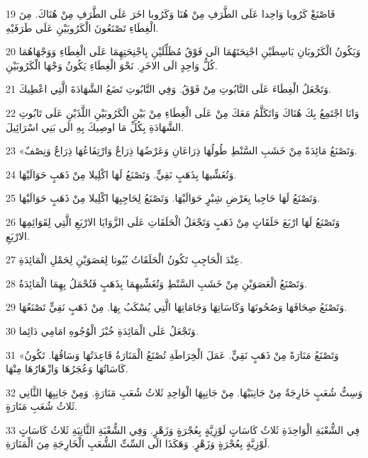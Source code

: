 \par 19 فَاصْنَعْ كَرُوبا وَاحِدا عَلَى الطَّرَفِ مِنْ هُنَا وَكَرُوبا اخَرَ عَلَى الطَّرَفِ مِنْ هُنَاكَ. مِنَ الْغِطَاءِ تَصْنَعُونَ الْكَرُوبَيْنِ عَلَى طَرَفَيْهِ.
\par 20 وَيَكُونُ الْكَرُوبَانِ بَاسِطَيْنِ اجْنِحَتَهُمَا الَى فَوْقُ مُظَلِّلَيْنِ بِاجْنِحَتِهِمَا عَلَى الْغِطَاءِ وَوَجْهَاهُمَا كُلُّ وَاحِدٍ الَى الاخَرِ. نَحْوَ الْغِطَاءِ يَكُونُ وَجْهَا الْكَرُوبَيْنِ.
\par 21 وَتَجْعَلُ الْغِطَاءَ عَلَى التَّابُوتِ مِنْ فَوْقُ. وَفِي التَّابُوتِ تَضَعُ الشَّهَادَةَ الَّتِي اعْطِيكَ.
\par 22 وَانَا اجْتَمِعُ بِكَ هُنَاكَ وَاتَكَلَّمُ مَعَكَ مِنْ عَلَى الْغِطَاءِ مِنْ بَيْنِ الْكَرُوبَيْنِ اللَّذَيْنِ عَلَى تَابُوتِ الشَّهَادَةِ بِكُلِّ مَا اوصِيكَ بِهِ الَى بَنِي اسْرَائِيلَ.
\par 23 «وَتَصْنَعُ مَائِدَةً مِنْ خَشَبِ السَّنْطِ طُولُهَا ذِرَاعَانِ وَعَرْضُهَا ذِرَاعٌ وَارْتِفَاعُهَا ذِرَاعٌ وَنِصْفٌ.
\par 24 وَتُغَشِّيهَا بِذَهَبٍ نَقِيٍّ. وَتَصْنَعُ لَهَا اكْلِيلا مِنْ ذَهَبٍ حَوَالَيْهَا.
\par 25 وَتَصْنَعُ لَهَا حَاجِبا بِعَرْضِ شِبْرٍ حَوَالَيْهَا. وَتَصْنَعُ لِحَاجِبِهَا اكْلِيلا مِنْ ذَهَبٍ حَوَالَيْهَا.
\par 26 وَتَصْنَعُ لَهَا ارْبَعَ حَلَقَاتٍ مِنْ ذَهَبٍ وَتَجْعَلُ الْحَلَقَاتِ عَلَى الزَّوَايَا الارْبَعِ الَّتِي لِقَوَائِمِهَا الارْبَعِ.
\par 27 عِنْدَ الْحَاجِبِ تَكُونُ الْحَلَقَاتُ بُيُوتا لِعَصَوَيْنِ لِحَمْلِ الْمَائِدَةِ.
\par 28 وَتَصْنَعُ الْعَصَوَيْنِ مِنْ خَشَبِ السَّنْطِ وَتُغَشِّيهِمَا بِذَهَبٍ فَتُحْمَلُ بِهِمَا الْمَائِدَةُ.
\par 29 وَتَصْنَعُ صِحَافَهَا وَصُحُونَهَا وَكَاسَاتِهَا وَجَامَاتِهَا الَّتِي يُسْكَبُ بِهَا. مِنْ ذَهَبٍ نَقِيٍّ تَصْنَعُهَا.
\par 30 وَتَجْعَلُ عَلَى الْمَائِدَةِ خُبْزَ الْوُجُوهِ امَامِي دَائِما.
\par 31 «وَتَصْنَعُ مَنَارَةً مِنْ ذَهَبٍ نَقِيٍّ. عَمَلَ الْخِرَاطَةِ تُصْنَعُ الْمَنَارَةُ قَاعِدَتُهَا وَسَاقُهَا. تَكُونُ كَاسَاتُهَا وَعُجَرُهَا وَازْهَارُهَا مِنْهَا.
\par 32 وَسِتُّ شُعَبٍ خَارِجَةٌ مِنْ جَانِبَيْهَا. مِنْ جَانِبِهَا الْوَاحِدِ ثَلاثُ شُعَبِ مَنَارَةٍ. وَمِنْ جَانِبِهَا الثَّانِي ثَلاثُ شُعَبِ مَنَارَةٍ.
\par 33 فِي الشُّعْبَةِ الْوَاحِدَةِ ثَلاثُ كَاسَاتٍ لَوْزِيَّةٍ بِعُجْرَةٍ وَزَهْرٍ. وَفِي الشُّعْبَةِ الثَّانِيَةِ ثَلاثُ كَاسَاتٍ لَوْزِيَّةٍ بِعُجْرَةٍ وَزَهْرٍ. وَهَكَذَا الَى السِّتِّ الشُّعَبِ الْخَارِجَةِ مِنَ الْمَنَارَةِ.
